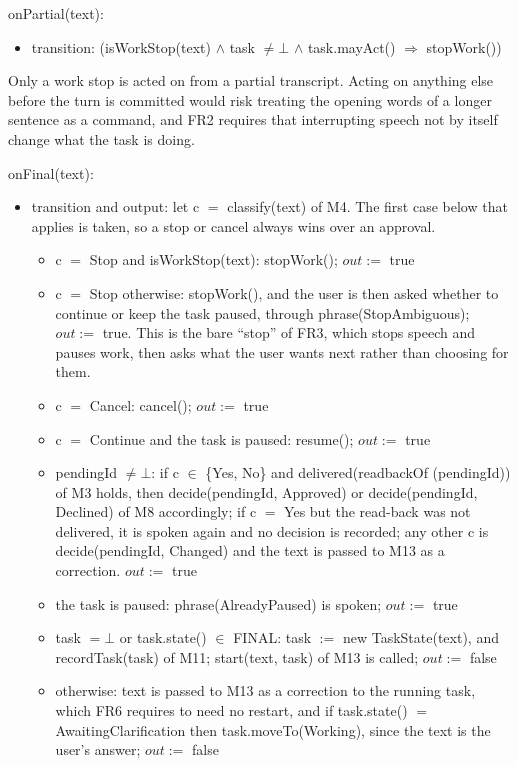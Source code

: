 \documentclass[12pt, titlepage]{article}
\newcommand{\nil}{\bot}
\begin{document}
\noindent onPartial(text):
\begin{itemize}
\item transition: (isWorkStop(text) $\wedge$ task $\neq \nil$ $\wedge$
task.mayAct() $\Rightarrow$ stopWork())
\end{itemize}

\noindent Only a work stop is acted on from a partial transcript. Acting on
anything else before the turn is committed would risk treating the opening words
of a longer sentence as a command, and FR2 requires that interrupting speech not
by itself change what the task is doing.

\noindent onFinal(text):
\begin{itemize}
\item transition and output: let c $=$ classify(text) of M4. The first case
below that applies is taken, so a stop or cancel always wins over an approval.
\begin{itemize}
\item c $=$ Stop and isWorkStop(text): stopWork(); $out :=$ true
\item c $=$ Stop otherwise: stopWork(), and the user is then asked whether to
continue or keep the task paused, through phrase(StopAmbiguous); $out :=$ true.
This is the bare ``stop'' of FR3, which stops speech and pauses work, then asks
what the user wants next rather than choosing for them.
\item c $=$ Cancel: cancel(); $out :=$ true
\item c $=$ Continue and the task is paused: resume(); $out :=$ true
\item pendingId $\neq \nil$: if c $\in$ \{Yes, No\} and delivered(readbackOf
(pendingId)) of M3 holds, then decide(pendingId, Approved) or decide(pendingId,
Declined) of M8 accordingly; if c $=$ Yes but the read-back was not delivered,
it is spoken again and no decision is recorded; any other c is decide(pendingId,
Changed) and the text is passed to M13 as a correction. $out :=$ true
\item the task is paused: phrase(AlreadyPaused) is spoken; $out :=$ true
\item task $= \nil$ or task.state() $\in$ FINAL: task $:=$ new TaskState(text),
and recordTask(task) of M11;
start(text, task) of M13 is called; $out :=$ false
\item otherwise: text is passed to M13 as a correction to the running task,
which FR6 requires to need no restart, and if task.state() $=$
AwaitingClarification then task.moveTo(Working), since the text is the user's
answer; $out :=$ false
\end{itemize}
\end{itemize}
\end{document}

